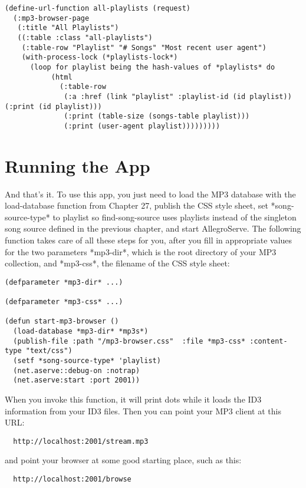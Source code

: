 \begin{lstlisting}
(define-url-function all-playlists (request)
  (:mp3-browser-page
   (:title "All Playlists")
   ((:table :class "all-playlists")
    (:table-row "Playlist" "# Songs" "Most recent user agent")
    (with-process-lock (*playlists-lock*)
      (loop for playlist being the hash-values of *playlists* do
           (html
             (:table-row
              (:a :href (link "playlist" :playlist-id (id playlist)) (:print (id playlist)))
              (:print (table-size (songs-table playlist)))
              (:print (user-agent playlist)))))))))
\end{lstlisting}

\section{Running the App}

And that's it. To use this app, you just need to load the MP3 database with the
load-database function from Chapter 27, publish the CSS style sheet, set
*song-source-type* to playlist so find-song-source uses playlists instead of the singleton
song source defined in the previous chapter, and start AllegroServe. The following
function takes care of all these steps for you, after you fill in appropriate values for
the two parameters *mp3-dir*, which is the root directory of your MP3 collection, and
*mp3-css*, the filename of the CSS style sheet:

\begin{lstlisting}
(defparameter *mp3-dir* ...)

(defparameter *mp3-css* ...)

(defun start-mp3-browser ()
  (load-database *mp3-dir* *mp3s*)
  (publish-file :path "/mp3-browser.css"  :file *mp3-css* :content-type "text/css")
  (setf *song-source-type* 'playlist)
  (net.aserve::debug-on :notrap)
  (net.aserve:start :port 2001))
\end{lstlisting}

When you invoke this function, it will print dots while it loads the ID3 information from
your ID3 files. Then you can point your MP3 client at this URL:

\begin{verbatim}
  http://localhost:2001/stream.mp3
\end{verbatim}

and point your browser at some good starting place, such as this:

\begin{verbatim}
  http://localhost:2001/browse
\end{verbatim}

